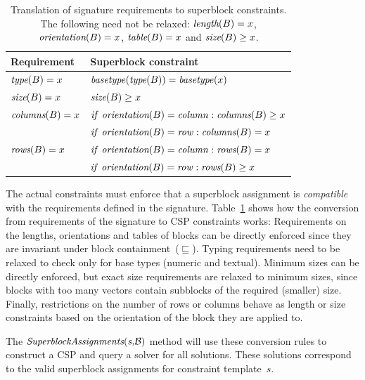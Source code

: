 \begin{table}[t]
  \caption{Translation of signature requirements to superblock constraints. The following need not be relaxed: $\textit{length}(B) = x$, $\textit{orientation}(B) = x$, $\textit{table}(B) = x$ and $\textit{size}(B) \geq x$.}
  \label{tbl:translation}
  \begin{tabularx}{\linewidth}{lX}
    \textbf{Requirement} & \textbf{Superblock constraint} \\ \hline \hline
    $\textit{type}(B) = x$ & $\mathit{basetype}(\textit{type}(B)) = \mathit{basetype}(x)$ \\ \hline
    $\textit{size}(B) = x$ & $\textit{size}(B) \geq x$ \\ \hline
    $\textit{columns}(B) = x$ & $\mathit{if}~\textit{orientation}(B) = \mathit{column}: \textit{columns}(B) \geq x$ \\ 
    & $\mathit{if}~\textit{orientation}(B) = \mathit{row}: \textit{columns}(B) = x$ \\ \hline
    $\textit{rows}(B) = x$ & $\mathit{if}~\textit{orientation}(B) = \mathit{column}: \textit{rows}(B) = x$ \\ 
    & $\mathit{if}~\textit{orientation}(B) = \mathit{row}: \textit{rows}(B) \geq x$
  \end{tabularx}
\end{table}

The actual constraints must enforce that a superblock assignment is \textit{compatible} with the requirements defined in the signature.
%
Table~\ref{tbl:translation} shows how the conversion from requirements of the signature to CSP constraints works:
Requirements on the lengths, orientations and tables of blocks can be directly enforced since they are invariant under block containment~($\sqsubseteq$).
Typing requirements need to be relaxed to check only for base types (numeric and textual).
Minimum sizes can be directly enforced, but exact size requirements are relaxed to minimum sizes, since blocks with too many vectors contain subblocks of the required (smaller) size.
Finally, restrictions on the number of rows or columns behave as length or size constraints based on the orientation of the block they are applied to.

The $\textit{SuperblockAssignments}(\textit{s,\ensuremath{\mathcal{B}}})$ method will use these conversion rules to construct a CSP and query a solver for all solutions.
These solutions correspond to the valid superblock assignments for constraint template~$s$.

